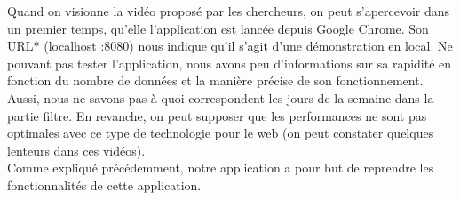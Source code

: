 \documentclass[12pt]{article}
\begin{document}
	Quand on visionne la vidéo proposé par les chercheurs, on peut s'apercevoir dans un premier
	temps, qu'elle l’application est lancée depuis Google Chrome. Son URL* (localhost :8080)
	nous indique qu’il s’agit d’une démonstration en local. Ne pouvant pas tester l’application,
	nous avons peu d’informations sur sa rapidité en fonction du nombre de données et la manière
	précise de son fonctionnement. Aussi, nous ne savons pas à quoi correspondent les jours de la
	semaine dans la partie filtre. En revanche, on peut supposer que les performances ne
	sont pas optimales avec ce type de technologie pour le web (on peut constater
	quelques lenteurs dans ces vidéos).\\
	Comme expliqué précédemment, notre application a pour but de reprendre les
	fonctionnalités de cette application.
	
	\newpage
\end{document}
